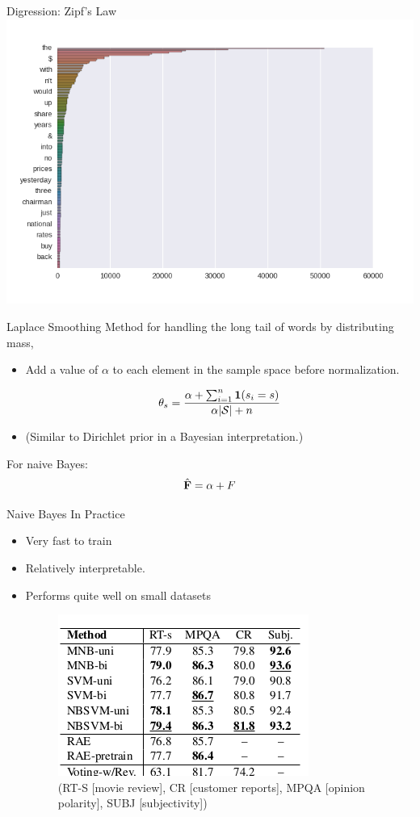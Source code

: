 \documentclass{beamer}
\begin{document}
\begin{frame}{Digression: Zipf's Law}
  \includegraphics[width=\textwidth]{../notebooks/zipf}
\end{frame}

\begin{frame}{Laplace Smoothing}
  Method for handling the long tail of words by distributing mass, 
  \begin{itemize}
  \item  Add a value of $\alpha$ to each element in the sample space before normalization.

    \[ \theta_s =  \frac{\alpha + \sum_{i=1}^n \mathbf{1}(s_i = s)}{\alpha|\mathcal{S}|  + n} \]
    
  \item (Similar to Dirichlet prior in a Bayesian interpretation.) 
  \end{itemize}
  
\pause
  For naive Bayes:
  \[\hat{\mathbf{F}} = \alpha + F\]
 
\end{frame}

\begin{frame}{Naive Bayes In Practice}
  \begin{itemize}
  \item Very fast to train
  \item Relatively interpretable.
  \item Performs quite well on small datasets

  \begin{figure}
    \includegraphics{data}
    \caption{  (RT-S [movie review], CR [customer reports], MPQA [opinion polarity], SUBJ [subjectivity])}
  \end{figure}
\end{itemize}

\end{frame}
\end{document}
